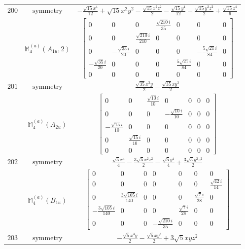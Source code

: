 \documentclass[fleqn,8pt,landscape]{jsarticle}
\begin{document}
\begin{longtable}{ccc}
$ 200 $ & $ \text{symmetry} $ & $ - \frac{\sqrt{15} x^{4}}{12} + \sqrt{15} x^{2} y^{2} - \frac{\sqrt{15} x^{2} z^{2}}{2} - \frac{\sqrt{15} y^{4}}{12} - \frac{\sqrt{15} y^{2} z^{2}}{2} + \frac{\sqrt{15} z^{4}}{6} $ \\
$  $ & $ \mathbb{M}_{4}^{(a)}(A_{1u},2) $ & $ \begin{bmatrix} 0 & 0 & 0 & \frac{\sqrt{210} i}{35} & 0 & 0 & 0 \\ 0 & 0 & \frac{\sqrt{210} i}{210} & 0 & 0 & 0 & 0 \\ 0 & - \frac{\sqrt{35} i}{20} & 0 & 0 & 0 & - \frac{5 \sqrt{21} i}{84} & 0 \\ - \frac{\sqrt{35} i}{20} & 0 & 0 & 0 & \frac{5 \sqrt{21} i}{84} & 0 & 0 \\ 0 & 0 & 0 & 0 & 0 & 0 & 0 \end{bmatrix} $ \\ \hline
$ 201 $ & $ \text{symmetry} $ & $ \frac{\sqrt{35} x^{3} y}{2} - \frac{\sqrt{35} x y^{3}}{2} $ \\
$  $ & $ \mathbb{M}_{4}^{(a)}(A_{2u}) $ & $ \begin{bmatrix} 0 & 0 & \frac{\sqrt{10} i}{10} & 0 & 0 & 0 & 0 \\ 0 & 0 & 0 & - \frac{\sqrt{10} i}{10} & 0 & 0 & 0 \\ - \frac{\sqrt{15} i}{10} & 0 & 0 & 0 & 0 & 0 & 0 \\ 0 & \frac{\sqrt{15} i}{10} & 0 & 0 & 0 & 0 & 0 \\ 0 & 0 & 0 & 0 & 0 & 0 & 0 \end{bmatrix} $ \\ \hline
$ 202 $ & $ \text{symmetry} $ & $ \frac{\sqrt{5} x^{4}}{4} - \frac{3 \sqrt{5} x^{2} z^{2}}{2} - \frac{\sqrt{5} y^{4}}{4} + \frac{3 \sqrt{5} y^{2} z^{2}}{2} $ \\
$  $ & $ \mathbb{M}_{4}^{(a)}(B_{1u}) $ & $ \begin{bmatrix} 0 & 0 & 0 & 0 & 0 & 0 & 0 \\ 0 & 0 & 0 & 0 & 0 & 0 & \frac{\sqrt{42} i}{14} \\ 0 & \frac{3 \sqrt{105} i}{140} & 0 & 0 & 0 & \frac{\sqrt{7} i}{28} & 0 \\ - \frac{3 \sqrt{105} i}{140} & 0 & 0 & 0 & \frac{\sqrt{7} i}{28} & 0 & 0 \\ 0 & 0 & 0 & - \frac{\sqrt{210} i}{35} & 0 & 0 & 0 \end{bmatrix} $ \\ \hline
$ 203 $ & $ \text{symmetry} $ & $ - \frac{\sqrt{5} x^{3} y}{2} - \frac{\sqrt{5} x y^{3}}{2} + 3 \sqrt{5} x y z^{2} $ \\

\end{longtable}
\end{document}
